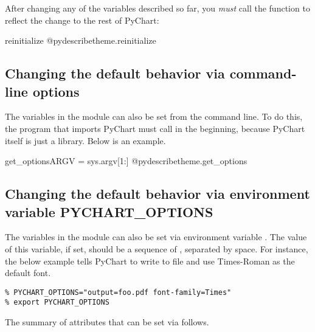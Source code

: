 \documentclass{howto}
\newcommand{\pychart}{PyChart}
\begin{document}
After changing any of the variables described so far, you \emph{must}
call the  function to reflect the change to
the rest of \pychart{}:

\begin{funcdesc}{reinitialize}{}
@pydescribe{theme.reinitialize}
\end{funcdesc}

\subsection{Changing the default behavior via command-line options}\label{command-line-options}

The variables in the  module can
also be set from the command line. To do this, the program
that imports \pychart{} must call  in the
beginning, because \pychart{} itself is just a library. Below is an example.

\begin{funcdesc}{get_options}{ARGV = sys.argv[1:]}
@pydescribe{theme.get_options}
\end{funcdesc}

\subsection{Changing the default behavior via environment variable PYCHART_OPTIONS}\label{PYCHART-OPTIONS}

The variables in the  module can also be set
via environment variable .
The value of this variable, if set, should be a
sequence of , separated by space.  For instance, the below
example tells \pychart{} to write to file  and use
Times-Roman as the default font.

\begin{verbatim}
% PYCHART_OPTIONS="output=foo.pdf font-family=Times"
% export PYCHART_OPTIONS
\end{verbatim}

The summary of attributes that can be set via 
follows.
\end{document}
